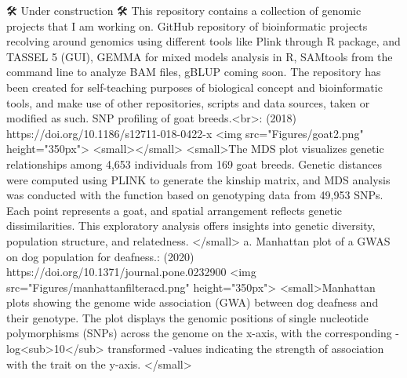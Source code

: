 \markdownRendererDocumentBegin
\markdownRendererSectionBegin
{}\markdownRendererInterblockSeparator
{}🛠️ Under construction 🛠️\markdownRendererInterblockSeparator
{}This repository contains a collection of genomic projects that I am working on. GitHub repository of bioinformatic projects recolving around genomics using different tools like Plink through  R package,  and TASSEL 5 (GUI), GEMMA for mixed models analysis in R, SAMtools from the command line to analyze BAM files, gBLUP coming soon.\markdownRendererInterblockSeparator
{}The repository has been created for self-teaching purposes of biological concept and bioinformatic tools, and make use of other repositories, scripts and data sources, taken or modified as such.\markdownRendererInterblockSeparator
{}\markdownRendererOlBeginTight
{}SNP profiling of goat breeds.<br>:  (2018) https://doi.org/10.1186/s12711-018-0422-x\markdownRendererOlItemEnd 
\markdownRendererOlEndTight \markdownRendererInterblockSeparator
{}<img src="Figures/goat2.png" height="350px">\markdownRendererInterblockSeparator
{}<small></small>\markdownRendererInterblockSeparator
{}<small>The MDS plot visualizes genetic relationships among 4,653 individuals from 169 goat breeds. Genetic distances were computed using PLINK to generate the kinship matrix, and MDS analysis was conducted with the  function based on genotyping data from 49,953 SNPs. Each point represents a goat, and spatial arrangement reflects genetic dissimilarities. This exploratory analysis offers insights into genetic diversity, population structure, and relatedness. </small>\markdownRendererInterblockSeparator
{}\markdownRendererOlBeginTight
{}a. Manhattan plot of a GWAS on dog population for deafness.:  (2020) https://doi.org/10.1371/journal.pone.0232900\markdownRendererOlItemEnd 
\markdownRendererOlEndTight \markdownRendererInterblockSeparator
{}<img src="Figures/manhattanfilter\markdownRendererUnderscore{}acd.png" height="350px"> <small>Manhattan plots showing the genome wide association (GWA) between dog deafness and their genotype. The plot displays the genomic positions of single nucleotide polymorphisms (SNPs) across the genome on the x-axis, with the corresponding -log<sub>10</sub> transformed -values indicating the strength of association with the trait on the y-axis. </small>\markdownRendererInterblockSeparator
